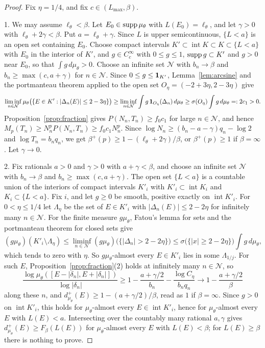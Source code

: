\begin{proof}
Fix $\eta=1/4$, and fix $c\in(L_{\max},\beta)$.

1. We may assume $\ell_\theta<\beta$. Let $E_0\in\operatorname{supp}\mu_\theta$ with $L(E_0)=\ell_\theta$, and let $\gamma>0$ with $\ell_\theta+2\gamma<\beta$. Put $a=\ell_\theta+\gamma$. Since $L$ is upper semicontinuous, $\{L<a\}$ is an open set containing $E_0$. Choose compact intervals $K'\subset\operatorname{int}K\subset K\subset\{L<a\}$ with $E_0$ in the interior of $K'$, and $g\in C_c^\infty$ with $0\le g\le1$, $\operatorname{supp} g\subset K'$ and $g>0$ near $E_0$, so that $\int g\,d\mu_\theta>0$. Choose an infinite set $\mathcal N$ with $b_n\to\beta$ and $b_n\ge\max(c,a+\gamma)$ for $n\in\mathcal N$. Since $0\le g\le\mathbf 1_{K'}$, Lemma~\ref{lem:arcsine} and the portmanteau theorem applied to the open set $O_\eta=(-2+3\eta,2-3\eta)$ give
\[
\liminf_{n\in\mathcal N}\mu_\theta\bigl(\{E\in K':|\Delta_n(E)|\le2-3\eta\}\bigr)\ge\liminf_{n\in\mathcal N}\int g\,\mathbf 1_{O_\eta}(\Delta_n)\,d\mu_\theta\ge\sigma(O_\eta)\int g\,d\mu_\theta=:2c_1>0 .
\]
Proposition~\ref{prop:fraction} gives $P(N_n,T_n)\ge f_0c_1$ for large $n\in\mathcal N$, and hence $M_p(T_n)\ge N_n^pP(N_n,T_n)\ge f_0c_1N_n^p$. Since $\log N_n\ge(b_n-a-\gamma)q_n-\log2$ and $\log T_n=b_nq_n$, we get $\beta^+(p)\ge1-(\ell_\theta+2\gamma)/\beta$, or $\beta^+(p)\ge1$ if $\beta=\infty$. Let $\gamma\to0$.

2. Fix rationals $a>0$ and $\gamma>0$ with $a+\gamma<\beta$, and choose an infinite set $\mathcal N$ with $b_n\to\beta$ and $b_n\ge\max(c,a+\gamma)$. The open set $\{L<a\}$ is a countable union of the interiors of compact intervals $K'_i$ with $K'_i\subset\operatorname{int}K_i$ and $K_i\subset\{L<a\}$. Fix $i$, and let $g\ge0$ be smooth, positive exactly on $\operatorname{int}K'_i$. For $0<\eta\le1/4$ let $\Lambda_\eta$ be the set of $E\in K'_i$ with $|\Delta_n(E)|\le2-2\eta$ for infinitely many $n\in\mathcal N$. For the finite measure $g\mu_\theta$, Fatou's lemma for sets and the portmanteau theorem for closed sets give
\[
(g\mu_\theta)(K'_i\setminus\Lambda_\eta)\le\liminf_{n\in\mathcal N}(g\mu_\theta)\bigl(\{|\Delta_n|>2-2\eta\}\bigr)\le\sigma\bigl(\{|x|\ge2-2\eta\}\bigr)\int g\,d\mu_\theta,
\]
which tends to zero with $\eta$. So $g\mu_\theta$-almost every $E\in K'_i$ lies in some $\Lambda_{1/j}$. For such $E$, Proposition~\ref{prop:fraction}(2) holds at infinitely many $n\in\mathcal N$, so
\[
\frac{\log\mu_\theta([E-|\delta_n|,E+|\delta_n|])}{\log|\delta_n|}\ge1-\frac{a+\gamma/2}{b_n}-\frac{\log C_\eta}{b_nq_n}\to1-\frac{a+\gamma/2}{\beta}
\]
along these $n$, and $d^+_{\mu_\theta}(E)\ge1-(a+\gamma/2)/\beta$, read as $1$ if $\beta=\infty$. Since $g>0$ on $\operatorname{int}K'_i$, this holds for $\mu_\theta$-almost every $E\in\operatorname{int}K'_i$, hence for $\mu_\theta$-almost every $E$ with $L(E)<a$. Intersecting over the countably many rational $a,\gamma$ gives $d^+_{\mu_\theta}(E)\ge F_\beta(L(E))$ for $\mu_\theta$-almost every $E$ with $L(E)<\beta$; for $L(E)\ge\beta$ there is nothing to prove.


\end{proof}
